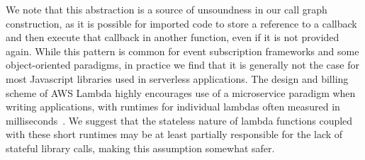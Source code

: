 \documentclass[letterpaper,twocolumn,10pt]{article}
\begin{document}
We note that this abstraction is a source of unsoundness in our call graph construction, as it is possible for imported code to store a reference to a callback and then execute that callback in another function, even if it is not provided again. While this pattern is common for event subscription frameworks and some object-oriented paradigms, in practice we find that it is generally not the case for most Javascript libraries used in serverless applications. The design and billing scheme of AWS Lambda highly encourages use of a microservice paradigm when writing applications, with runtimes for individual lambdas often measured in milliseconds~\cite{microservice}. We suggest that the stateless nature of lambda functions coupled with these short runtimes may be at least partially responsible for the lack of stateful library calls, making this assumption somewhat safer.


%




\end{document}
